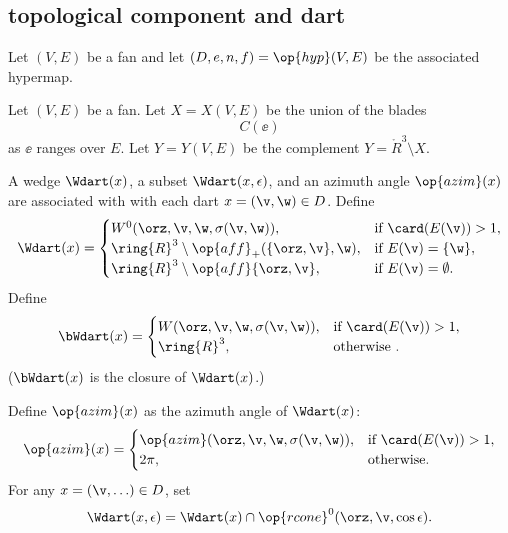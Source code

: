 \subsection{topological component and dart}

Let $(V,E)$ be a fan and let $(D,e,n,f) = \op{hyp}(V,E)$
be the associated hypermap.  
%
%
%

\begin{definition}[X,~Y]\label{def:XY}
Let $(V,E)$ be a fan.  Let $X=X(V,E)$ be the union of the
blades
\begin{displaymath}C(\ee)\end{displaymath}
as $\ee$ ranges over $E$.  Let $Y=Y(V,E)$ be the complement
$Y = \ring{R}^3\setminus X$.
%
%
\end{definition}


A wedge $\Wdart(x)$, a subset $\Wdart(x,\epsilon)$,
and an azimuth angle $\op{azim}(x)$ are associated with
with each dart $x=(\v,\w)\in D$.  Define 
%
%
%
%
%
%
\begin{displaymath}
\Wdart(x)=
\begin{cases} 
W^0(\orz,\v,\w,\sigma(\v,\w)),&\text{if }\card(E(\v))>1,\\
\ring{R}^3\setminus \op{aff}_+(\{\orz,\v\},\w),&\text{if } E(\v) = \{\w\},\\
\ring{R}^3\setminus \op{aff}\{\orz,\v\},&\text{if } E(\v) = \emptyset.\\
\end{cases}
\end{displaymath}
Define
\begin{displaymath}
\bWdart(x) = 
\begin{cases} 
W(\orz,\v,\w,\sigma(\v,\w)),&\text{if }\card(E(\v))>1,\\
\ring{R}^3,&\text{otherwise }.\\
\end{cases}
\end{displaymath}
%
($\bWdart(x)$ is the closure of $\Wdart(x)$.)


Define $\op{azim}(x)$ as the azimuth angle of $\Wdart(x)$:
%
\begin{displaymath}
\op{azim}(x)=\begin{cases}
\op{azim}(\orz,\v,\w,\sigma(\v,\w)), &\text{if } \card(E(\v)) > 1,\\
2\pi, & \text{otherwise.}\\
\end{cases}
\end{displaymath}
For any $x = (\v,\ldots)\in D$, set
\begin{displaymath}
\Wdart(x,\epsilon) = \Wdart(x) \cap \op{rcone}^0(\orz,\v,\cos\epsilon).
\end{displaymath}

